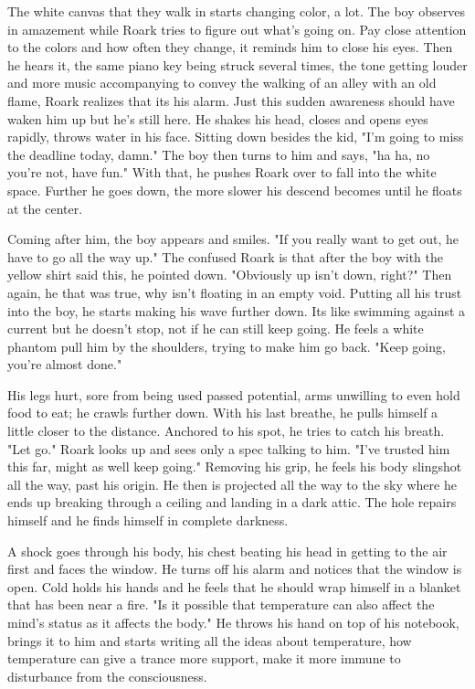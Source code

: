         The white canvas that they walk in starts changing color, a lot. The boy observes in amazement while Roark tries to figure out what's
    going on. Pay close attention to the colors and how often they change, it reminds him to close his eyes. Then he hears it, the same piano
    key being struck several times, the tone getting louder and more music accompanying to convey the walking of an alley with an old flame, 
    Roark realizes that its his alarm. Just this sudden awareness should have waken him up but he's still here. He shakes his head, closes and
    opens eyes rapidly, throws water in his face. Sitting down besides the kid, "I'm going to miss the deadline today, damn." The boy then
    turns to him and says, "ha ha, no you're not, have fun." With that, he pushes Roark over to fall into the white space. Further he goes down,
    the more slower his descend becomes until he floats at the center.

        Coming after him, the boy appears and smiles. "If you really want to get out, he have to go all the way up." The confused Roark is that
    after the boy with the yellow shirt said this, he pointed down. "Obviously up isn't down, right?" Then again, he that was true, why isn't
    floating in an empty void. Putting all his trust into the boy, he starts making his wave further down. Its like swimming against a current
    but he doesn't stop, not if he can still keep going. He feels a white phantom pull him by the shoulders, trying to make him go back.
    "Keep going, you're almost done."

        His legs hurt, sore from being used passed potential, arms unwilling to even hold food to eat; he crawls further down. With his last
    breathe, he pulls himself a little closer to the distance. Anchored to his spot, he tries to catch his breath. "Let go." Roark looks up
    and sees only a spec talking to him. "I've trusted him this far, might as well keep going." Removing his grip, he feels his body slingshot
    all the way, past his origin. He then is projected all the way to the sky where he ends up breaking through a ceiling and landing in a 
    dark attic. The hole repairs himself and he finds himself in complete darkness.

        A shock goes through his body, his chest beating his head in getting to the air first and faces the window. He turns off his alarm and
    notices that the window is open. Cold holds his hands and he feels that he should wrap himself in a blanket that has been near a fire. 
    "Is it possible that temperature can also affect the mind's status as it affects the body." He throws his hand on top of his notebook,
    brings it to him and starts writing all the ideas about temperature, how temperature can give a trance more support, make it more immune
    to disturbance from the consciousness.

